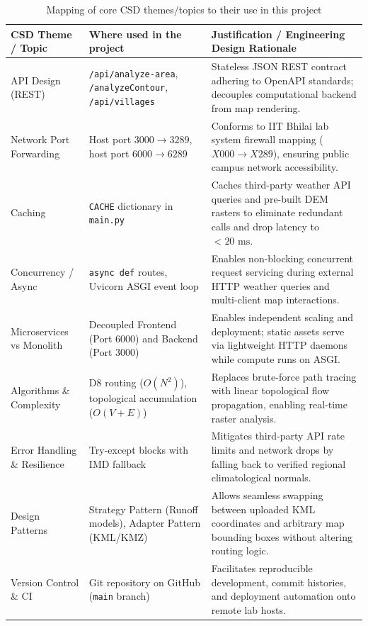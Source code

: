 \documentclass[manuscript,screen,nonacm]{acmart}
\begin{document}
\begin{table}[t]
  \caption{Mapping of core CSD themes/topics to their use in this project}
  \label{tab:csd-themes}
  \begin{tabular}{p{3.2cm}p{5.4cm}p{7.0cm}}
    \toprule
    CSD Theme / Topic & Where used in the project & Justification / Engineering Design Rationale \\
    \midrule
    API Design (REST) & \texttt{/api/analyze-area}, \texttt{/analyzeContour}, \texttt{/api/villages} & Stateless JSON REST contract adhering to OpenAPI standards; decouples computational backend from map rendering. \\
    Network Port Forwarding & Host port $3000 \to 3289$, host port $6000 \to 6289$ & Conforms to IIT Bhilai lab system firewall mapping ($X000 \to X289$), ensuring public campus network accessibility. \\
    Caching & \texttt{CACHE} dictionary in \texttt{main.py} & Caches third-party weather API queries and pre-built DEM rasters to eliminate redundant calls and drop latency to $<20\text{ ms}$. \\
    Concurrency / Async & \texttt{async def} routes, Uvicorn ASGI event loop & Enables non-blocking concurrent request servicing during external HTTP weather queries and multi-client map interactions. \\
    Microservices vs Monolith & Decoupled Frontend (Port 6000) and Backend (Port 3000) & Enables independent scaling and deployment; static assets serve via lightweight HTTP daemons while compute runs on ASGI. \\
    Algorithms \& Complexity & D8 routing ($O(N^2)$), topological accumulation ($O(V+E)$) & Replaces brute-force path tracing with linear topological flow propagation, enabling real-time raster analysis. \\
    Error Handling \& Resilience & Try-except blocks with IMD fallback & Mitigates third-party API rate limits and network drops by falling back to verified regional climatological normals. \\
    Design Patterns & Strategy Pattern (Runoff models), Adapter Pattern (KML/KMZ) & Allows seamless swapping between uploaded KML coordinates and arbitrary map bounding boxes without altering routing logic. \\
    Version Control \& CI & Git repository on GitHub (\texttt{main} branch) & Facilitates reproducible development, commit histories, and deployment automation onto remote lab hosts. \\
    \bottomrule
  \end{tabular}
\end{table}
\end{document}
